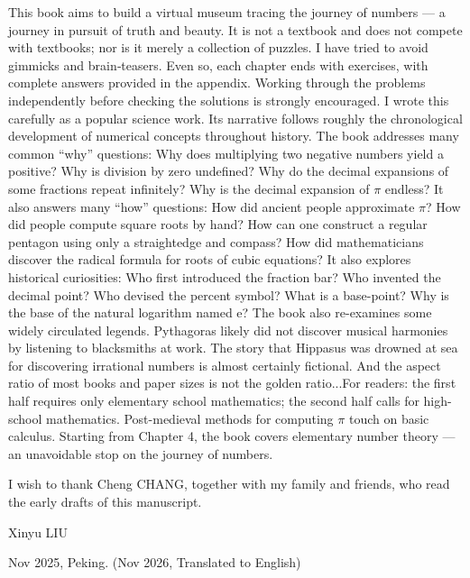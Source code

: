 \documentclass[b5paper]{article}
\begin{document}
This book aims to build a virtual museum tracing the journey of numbers — a journey in pursuit of truth and beauty. It is not a textbook and does not compete with textbooks; nor is it merely a collection of puzzles. I have tried to avoid gimmicks and brain‑teasers. Even so, each chapter ends with exercises, with complete answers provided in the appendix. Working through the problems independently before checking the solutions is strongly encouraged. I wrote this carefully as a popular science work. Its narrative follows roughly the chronological development of numerical concepts throughout history. The book addresses many common ``why'' questions: Why does multiplying two negative numbers yield a positive? Why is division by zero undefined? Why do the decimal expansions of some fractions repeat infinitely? Why is the decimal expansion of \(\pi\) endless? It also answers many ``how'' questions: How did ancient people approximate \(\pi\)? How did people compute square roots by hand? How can one construct a regular pentagon using only a straightedge and compass? How did mathematicians discover the radical formula for roots of cubic equations? It also explores historical curiosities: Who first introduced the fraction bar? Who invented the decimal point? Who devised the percent symbol? What is a base-point? Why is the base of the natural logarithm named e? The book also re-examines some widely circulated legends. Pythagoras likely did not discover musical harmonies by listening to blacksmiths at work. The story that Hippasus was drowned at sea for discovering irrational numbers is almost certainly fictional. And the aspect ratio of most books and paper sizes is not the golden ratio...For readers: the first half requires only elementary school mathematics; the second half calls for high-school mathematics. Post-medieval methods for computing \(\pi\) touch on basic calculus. Starting from Chapter 4, the book covers elementary number theory — an unavoidable stop on the journey of numbers.

I wish to thank Cheng CHANG, together with my family and friends, who read the early drafts of this manuscript.

\vspace{15mm}

Xinyu LIU

Nov 2025, Peking. (Nov 2026, Translated to English)

\ifx\wholebook\relax \else

\expandafter\enddocument

\fi
\end{document}
